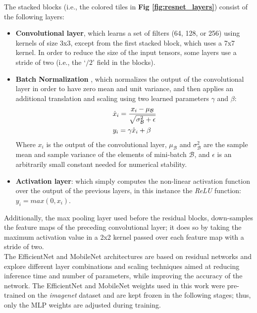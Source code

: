 \noindent
The stacked blocks (i.e., the colored tiles in \textbf{Fig \ref{fig:resnet_layers}}) consist of the following layers:
\begin{itemize}
    \item \textbf{Convolutional layer}, which learns a set of filters (64, 128, or 256) using kernels of size 3x3, except from the first stacked block, which uses a 7x7 kernel. In order to reduce the size of the input tensors, some layers use a stride of two (i.e., the `$/2$' field in the blocks).
    
    \item \textbf{Batch Normalization} \cite{ioffe2015batch}, which normalizes the output of the convolutional layer in order to have zero mean and unit variance, and then applies an additional translation and scaling using two learned parameters $\gamma$ and $\beta$:
    \begin{equation*}
    \begin{split}
        \centering
            &\hat x_i = \frac{x_i - \mu_\mathcal{B}}{\sqrt{\sigma^2_\mathcal{B} + \epsilon}}\\
            &y_i = \gamma\hat x_i + \beta\\
    \end{split}
    \end{equation*}
    Where $x_i$ is the output of the convolutional layer, $\mu_\mathcal{B}$ and $\sigma^2_\mathcal{B}$ are the sample mean and sample variance of the elements of mini-batch $\mathcal{B}$, and $\epsilon$ is an arbitrarily small constant needed for numerical stability.
    
    \item \textbf{Activation layer}: which simply computes the non-linear activation function over the output of the previous layers, in this instance the \textit{ReLU} function: $y_i = max(0, x_i)$. 
\end{itemize}

\noindent
Additionally, the max pooling layer used before the residual blocks, down-samples the feature maps of the preceding convolutional layer; it does so by taking the maximum activation value in a 2x2 kernel passed over each feature map with a stride of two.\\

\noindent
The EfficientNet and MobileNet architectures are based on residual networks and explore different layer combinations and scaling techniques aimed at reducing inference time and number of parameters, while improving the accuracy of the network.
The EfficientNet and MobileNet weights used in this work were pre-trained on the \textit{imagenet} dataset \cite{deng2009imagenet} and are kept frozen in the following stages; thus, only the MLP weights are adjusted during training.

